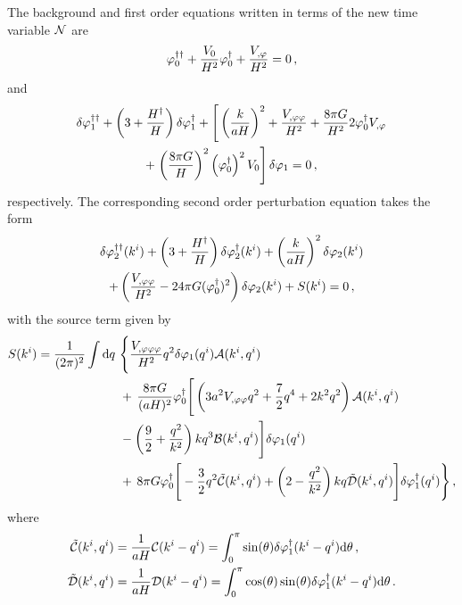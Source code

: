 % 
The background and first order equations written in terms of the new time
variable $\mathcal{N}$ are
%
\begin{equation}
\varphi_{0}^{\dagger\dagger} + \frac{V_{0}}{H^2}\varphi_{0}^{\dagger} + \frac{V_{,\varphi}}{H^2} = 0 \,,
\label{eq:bgntime}
\end{equation}
% 
and
% 
\begin{multline}
\ddN{\dvp1} + \left(3 + \frac{\dN{H}}{H}\right)\dN{\dvp1} 
 + \Bigg[ \left(\frac{k}{aH}\right)^2 + \frac{\Upp}{H^2} + \frac{8\pi G}{H^2}
 2\dN{\vp_{0}}\Uphi \\
% 
+ \left.\left(\frac{8\pi G}{H}\right)^2
\left(\dN{\vp_{0}}\right)^2\U \right]\dvp1 = 0\,, \label{eq:fontime}
\end{multline}
% 
respectively.
The corresponding second order perturbation equation takes the form
% 
\begin{multline}
 \label{eq:KG2-fourier-sr-ntime}
\ddN{\dvp2}(\kvi) + \left(3 + \frac{\dN{H}}{H}\right)
\dN{\dvp2}(\kvi)+ \left(\frac{k}{aH}\right)^2\dvp2(\kvi) \\
% 
+ \left(\frac{\Upp}{H^2}-{24 \pi G}(\dN{\vp_{0}})^2\right)
\dvp2(\kvi) +S(\kvi) = 0 \,,
\end{multline}
% 
with the source term given by
\begin{align}
\label{eq:KG2-source-ntime}
S(\kvi) = \frac{1}{(2\pi)^2}\int \d q\ &\Bigg\{
\frac{\Uppp}{H^2} q^2 \dvp1(\qvi) \A(\kvi,\qvi) \nonumber\\
&+\, \frac{8\pi G}{(aH)^2}\dN{\vp_{0}} \Bigg[ 
\left( 3a^2\Upp q^2 + \frac{7}{2}q^4 + 2k^2q^2\right) \A(\kvi,\qvi) \nonumber\\
% 
&-\left(\frac{9}{2} + \frac{q^2}{k^2}\right)kq^3 \B(\kvi,\qvi)
\Bigg]\dvp1(\qvi) \nonumber\\
%
&+\, 8\pi G \dN{\vp_{0}} \Bigg[
-\frac{3}{2}q^2 \tilde{\C}(\kvi,\qvi) + \left(2-\frac{q^2}{k^2}\right)kq
\tilde{\D}(\kvi,\qvi) 
\Bigg]\dN{\dvp1}(\qvi) \Bigg\}\,,
%
\end{align}
%
where 
%
\begin{align}
 \tilde{\mathcal{C}}(k^i,q^i) &= \frac{1}{aH} \mathcal{C}(k^i-q^i) = \int_0^\pi \sin(\theta)
\delta\varphi_{1}^{\dagger}(k^i-q^i) \mathrm{d}\theta \,,\nonumber \\
 \tilde{\mathcal{D}}(k^i,q^i) &= \frac{1}{aH} \mathcal{D}(k^i-q^i) = \int_0^\pi \cos(\theta)
\sin(\theta) \delta\varphi_{1}^{\dagger}(k^i-q^i)
\mathrm{d}\theta \,.
\end{align}



